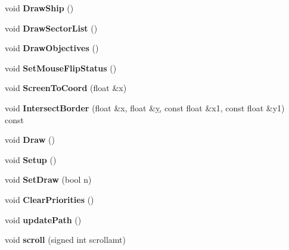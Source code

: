 \begin{DoxyCompactItemize}
\item 
void {\bfseries Draw\+Ship} ()\hypertarget{classNavigationSystem_ab78f8027115638eee4862da6da4c79ae}{}\label{classNavigationSystem_ab78f8027115638eee4862da6da4c79ae}

\item 
void {\bfseries Draw\+Sector\+List} ()\hypertarget{classNavigationSystem_a8c942f4e9139a37e4e3ab5c7c269575e}{}\label{classNavigationSystem_a8c942f4e9139a37e4e3ab5c7c269575e}

\item 
void {\bfseries Draw\+Objectives} ()\hypertarget{classNavigationSystem_a726c59c4e343c7c7448e542597b5f7cc}{}\label{classNavigationSystem_a726c59c4e343c7c7448e542597b5f7cc}

\item 
void {\bfseries Set\+Mouse\+Flip\+Status} ()\hypertarget{classNavigationSystem_ab263522186c80d2315ee8e4f3f359764}{}\label{classNavigationSystem_ab263522186c80d2315ee8e4f3f359764}

\item 
void {\bfseries Screen\+To\+Coord} (float \&x)\hypertarget{classNavigationSystem_a6fc66d8a0142fdb26d41638104be1ba9}{}\label{classNavigationSystem_a6fc66d8a0142fdb26d41638104be1ba9}

\item 
void {\bfseries Intersect\+Border} (float \&x, float \&\hyperlink{IceUtils_8h_aa7ffaed69623192258fb8679569ff9ba}{y}, const float \&x1, const float \&y1) const \hypertarget{classNavigationSystem_a13e8042bac09aeef3512a8cef3c8f213}{}\label{classNavigationSystem_a13e8042bac09aeef3512a8cef3c8f213}

\item 
void {\bfseries Draw} ()\hypertarget{classNavigationSystem_aa362418068ae260c5044dd2f81ebd4ef}{}\label{classNavigationSystem_aa362418068ae260c5044dd2f81ebd4ef}

\item 
void {\bfseries Setup} ()\hypertarget{classNavigationSystem_ad6982f9bc588d660dd177e78bda5f65c}{}\label{classNavigationSystem_ad6982f9bc588d660dd177e78bda5f65c}

\item 
void {\bfseries Set\+Draw} (bool n)\hypertarget{classNavigationSystem_a6d6f6dc599a6fb2bedc35fae4805a59a}{}\label{classNavigationSystem_a6d6f6dc599a6fb2bedc35fae4805a59a}

\item 
void {\bfseries Clear\+Priorities} ()\hypertarget{classNavigationSystem_a64b3011a3a9eb4ecb30b90711671c248}{}\label{classNavigationSystem_a64b3011a3a9eb4ecb30b90711671c248}

\item 
void {\bfseries update\+Path} ()\hypertarget{classNavigationSystem_a54cd86537c20203e05d7f1c75f179e07}{}\label{classNavigationSystem_a54cd86537c20203e05d7f1c75f179e07}

\item 
void {\bfseries scroll} (signed int scrollamt)\hypertarget{classNavigationSystem_a4e0704cff013cf5aa7f8441f291f8703}{}\label{classNavigationSystem_a4e0704cff013cf5aa7f8441f291f8703}

\end{DoxyCompactItemize}

